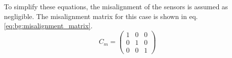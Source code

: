 To simplify these equations, the misalignment of the sensors is assumed as negligible. The misalignment matrix for this case is shown in eq. \eqref{eq:bg:misalignment_matrix}.
\begin{equation}
    C_m= \begin{pmatrix} 1 & 0 & 0 \\
                         0 & 1 & 0 \\
                         0 & 0 & 1 \end{pmatrix}
                         \label{eq:bg:misalignment_matrix}
\end{equation}
